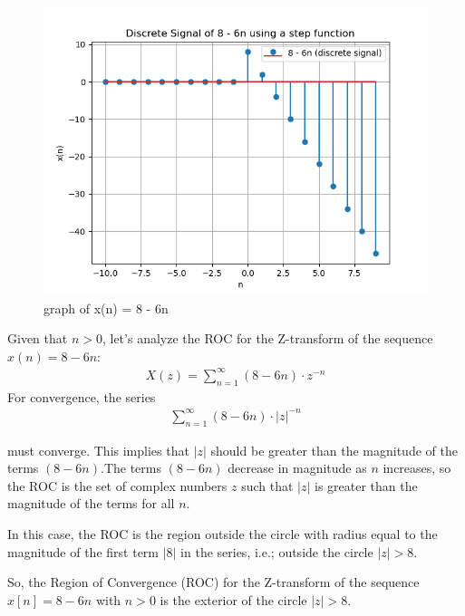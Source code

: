 \documentclass[journal,12pt,twocolumn]{IEEEtran}
\theoremstyle{remark}
\begin{document}
    \begin{figure}[h]
        \centering
        \includegraphics[width=1\linewidth]{figs/figure.png}
        \caption{graph of x(n) = 8 - 6n}
        \label{8 - 6n dicrete function}
    \end{figure}

Given that \( n > 0 \), let's analyze the ROC for the Z-transform of the sequence $x(n) = 8 - 6n$:
    \begin{align}
    X(z) = \sum_{n=1}^{\infty} (8 - 6n) \cdot z^{-n}
    \end{align}
For convergence, the series 
    \begin{align}
    \sum_{n=1}^{\infty} (8 - 6n) \cdot |z|^{-n}
    \end{align}

\vspace{2mm}
must converge. This implies that \( |z| \) should be greater than the magnitude of the terms \( (8 - 6n) \).The terms \( (8 - 6n) \) decrease in magnitude as \( n \) increases, so the ROC is the set of complex numbers \( z \) such that \( |z| \) is greater than the magnitude of the terms for all \( n \).

\vspace{2mm}
In this case, the ROC is the region outside the circle with radius equal to the magnitude of the first term \( |8| \) in the series, i.e.; outside the circle \( |z| > 8 \).

\vspace{2mm}
So, the Region of Convergence (ROC) for the Z-transform of the sequence \( x[n] = 8 - 6n \) with \( n > 0 \) is the exterior of the circle \( |z| > 8 \).
\end{document}
